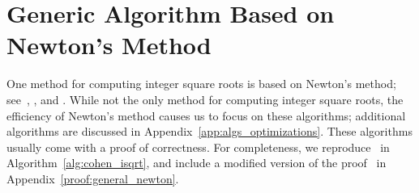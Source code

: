\section{Generic Algorithm Based on Newton's Method}

One method for computing integer square roots is based
on Newton's method;
see~\cite[Algorithm 1.7.1]{cohen1993},
\cite[Algorithm 9.2.11]{PrimeNumbersACP2005},
and \cite[Algorithm 1.13]{ModernComputerArithmetic051}.
While not the only method for computing integer square roots,
the efficiency of Newton's method causes us to focus on these algorithms;
additional algorithms are discussed in
Appendix~\ref{app:algs_optimizations}.
These algorithms usually come with a proof of correctness.
For completeness, we reproduce~\cite[Algorithm~1.7.1]{cohen1993}
in Algorithm~\ref{alg:cohen_isqrt},
and include a modified version of the
proof~\cite[Algorithm~1.7.1, Proof]{cohen1993}
in Appendix~\ref{proof:general_newton}.


